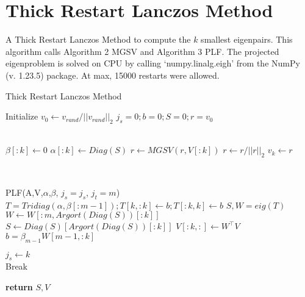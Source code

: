 \documentclass[a4paper]{article}
\begin{document}
\pagebreak

\section{Thick Restart Lanczos Method}
A Thick Restart Lanczos Method to compute the $k$ smallest eigenpairs. This algorithm calls Algorithm 2 MGSV and Algorithm 3 PLF. The projected eigenproblem is solved on CPU by calling ‘numpy.linalg.eigh’ from the NumPy (v. 1.23.5) package. At max, 15000 restarts were allowed.


\begin{algorithm}
\caption{Thick Restart Lanczos Method}\label{alg:TRLM}
\begin{algorithmic}[1]
\State Initialize $v_0 \gets v_{rand}/||v_{rand}||_2 $
\State $j_s = 0; b = 0; S = 0; r = v_0$

        \\
        \State $\beta[:k] \gets 0$
        \State $\alpha[:k] \gets Diag(S)$
        \State $r \gets MGSV(r,V[:k])$
        \State $r \gets r / ||r||_2$
        \State $v_k \gets r$

        \\
        
        \State PLF(A,V,$\alpha$,$\beta$, $j_s = j_s$, $j_t = m$) 
        \\
        \State $T = Tridiag(\alpha,\beta[:m-1]); T[k,:k] \gets b; T[:k,k] \gets b$
        \State $S,W = eig(T)$
        \State $W \gets W[:m,Argort(Diag(S))[:k]]$
        \State $S \gets Diag(S)[Argort(Diag(S))[:k]]$
        \State $V[:k,:] \gets W^\top V$
        \State $b = \beta_{m-1} W[m-1, :k]$ 
        
        \State $j_s \gets k$ 
        \\
            \State Break
        \EndIf
        
        
\EndFor



\State \textbf{return} $S, V$

\EndProcedure
\end{algorithmic}
\end{algorithm}
\end{document}
